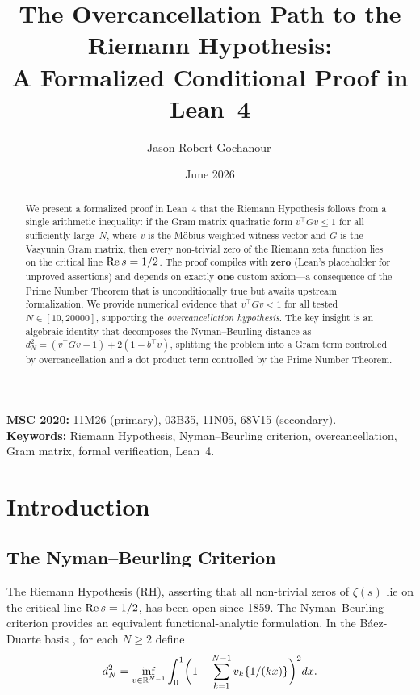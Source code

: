 \documentclass[11pt,a4paper]{article}
\title{%
  The Overcancellation Path to the Riemann Hypothesis:\\
  A Formalized Conditional Proof in Lean~4%
}
\author{
  Jason Robert Gochanour\,\orcidlink{0000-0002-2862-526X}
}
\date{June 2026}
\begin{document}
\maketitle

\noindent
\textbf{MSC 2020:} 11M26 (primary), 03B35, 11N05, 68V15 (secondary).\\
\textbf{Keywords:} Riemann Hypothesis, Nyman--Beurling criterion,
overcancellation, Gram matrix, formal verification, Lean~4.

\begin{abstract}
We present a formalized proof in Lean~4 that the Riemann Hypothesis
follows from a single arithmetic inequality: if the Gram matrix
quadratic form $v^\top G v \leq 1$ for all sufficiently large~$N$,
where $v$ is the M\"obius-weighted witness vector and $G$ is the
Vasyunin Gram matrix, then every non-trivial zero of the Riemann
zeta function lies on the critical line $\operatorname{Re} s = 1/2$. The proof
compiles with \textbf{zero } (Lean's placeholder for
unproved assertions) and depends on exactly \textbf{one} custom
axiom---a consequence of the Prime Number Theorem that is
unconditionally true but awaits upstream formalization. We provide
numerical evidence that $v^\top G v < 1$ for all tested
$N \in [10, 20000]$, supporting the \emph{overcancellation
hypothesis}. The key insight is an algebraic identity that
decomposes the Nyman--Beurling distance as
$d_N^2 = (v^\top G v - 1) + 2(1 - b^\top v)$,
splitting the problem into a Gram term controlled by overcancellation
and a dot product term controlled by the Prime Number Theorem.
\end{abstract}

\tableofcontents

\section{Introduction}
\label{sec:intro}

\subsection{The Nyman--Beurling Criterion}

The Riemann Hypothesis (RH), asserting that all non-trivial zeros
of $\zeta(s)$ lie on the critical line $\operatorname{Re} s = 1/2$, has been
open since 1859. The Nyman--Beurling criterion
\cite{nyman1950,beurling1955} provides an equivalent functional-analytic
formulation. In the B\'aez-Duarte basis \cite{baezduarte2003},
for each $N \geq 2$ define
\[
  d_N^2 = \inf_{v \in \mathbb{R}^{N-1}} \int_0^1
    \biggl(1 - \sum_{k=1}^{N-1} v_k \{1/(kx)\}\biggr)^2 dx.
\]
\end{document}
